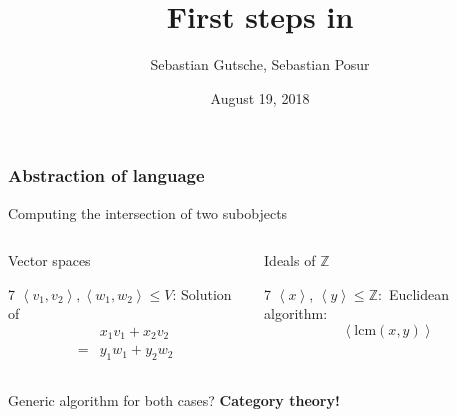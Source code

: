 \documentclass{beamer}
\title[\CapPkg]{First steps in \CapPkg}
\author[Gutsche, Posur]{Sebastian Gutsche, Sebastian Posur}
\date[August 19, 2018]{August 19, 2018}
\institute[Siegen]{Siegen University}
\newcommand{\Z}{\mathbb{Z}}
\begin{document}
\begin{frame}[fragile]
\titlepage
\end{frame}

\begin{frame}[fragile]
 \frametitle{Abstraction of language}
 \begin{block}{Computing the intersection of two subobjects}
  \begin{columns}[onlytextwidth, t]
  \pause
  \begin{block}{Vector spaces}
  \begin{overlayarea}{\linewidth}{7\baselineskip}
  $\left\langle v_1, v_2 \right\rangle, \left\langle w_1, w_2 \right\rangle \leq V$:\newline \pause
  Solution of
  \begin{align*}
   & x_1v_1 + x_2 v_2 \\
   = & y_1w_1 +y_2w_2
  \end{align*}
  \end{overlayarea}
  \end{block} \pause
  \begin{block}{Ideals of $\mathbb{Z}$\vphantom{Vector spaces}} \pause
  \begin{overlayarea}{\linewidth}{7\baselineskip}
  $\left\langle x\right\rangle$, $\left\langle y\right\rangle \leq \Z:$\newline \pause
  Euclidean algorithm:
  \[
   \left\langle \mathrm{lcm} \left( x,y \right) \right\rangle
  \]
  
  \end{overlayarea}
  \end{block}\pause
  \end{columns}
 \begin{center}
 Generic algorithm for both cases? \pause
 \textbf{Category theory!}
 \end{center}
 \end{block}
\end{frame}
\end{document}
